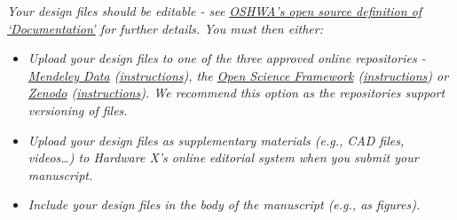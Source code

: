 \documentclass[11pt, letterpaper]{article}
\begin{document}
\textit{Your design files should be editable - see \href{https://www.oshwa.org/definition/}{OSHWA’s open source definition of ‘Documentation’} for further details. You must then either:}
\begin{itemize}
  \item[$\bullet$]{\it Upload your design files to one of the three approved online repositories - \href{https://data.mendeley.com/}{Mendeley Data} (\href{https://doi.org/10.5281/zenodo.3346799}{instructions}), the \href{https://osf.io/}{Open Science Framework} (\href{https://osf.io/wgk7q/wiki/home/}{instructions}) or \href{https://zenodo.org/}{Zenodo} (\href{https://doi.org/10.5281/zenodo.3346799}{instructions}). We recommend this option as the repositories support versioning of files.}
  \item[$\bullet$]{\it Upload your design files as supplementary materials (e.g., CAD files, videos…) to Hardware X’s online editorial system when you submit your manuscript.}
  \item[$\bullet$]{\it Include your design files in the body of the manuscript (e.g., as figures).}
\end{itemize}
\end{document}
